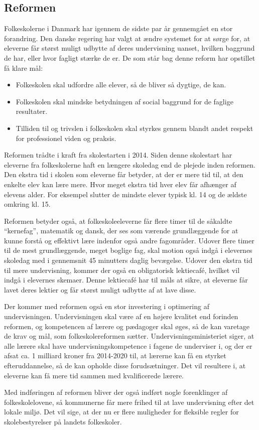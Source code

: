 \subsection{Reformen}
\label{Reformen}
Folkeskolerne i Danmark har igennem de sidste par år gennemgået en stor forandring. Den danske regering har valgt at ændre systemet for at sørge for, at eleverne får størst muligt udbytte af deres undervisning uanset, hvilken baggrund de har, eller hvor fagligt stærke de er.
De som står bag denne reform har opstillet få klare mål\cite{reformenMaal}:
	\begin{itemize}
		\item Folkeskolen skal udfordre alle elever, så de bliver så dygtige, de kan.
		\item Folkeskolen skal mindske betydningen af social baggrund for de faglige resultater.
		\item Tilliden til og trivslen i folkeskolen skal styrkes gennem blandt andet respekt for professionel viden og praksis.
	\end{itemize}

Reformen trådte i kraft fra skolestarten i 2014. Siden denne skolestart har eleverne fra folkeskolerne haft en længere skoledag end de plejede inden reformen. Den ekstra tid i skolen som eleverne får betyder, at der er mere tid til, at den enkelte elev kan lære mere. Hvor meget ekstra tid hver elev får afhænger af elevens alder. For eksempel slutter de mindste elever typisk kl. 14 og de ældste omkring kl. 15.

Reformen betyder også, at folkeskoleeleverne får flere timer til de såkaldte ``kernefag'', matematik og dansk, der ses som værende grundlæggende for at kunne forstå og effektivt lære indenfor også andre fagområder. Udover flere timer til de mest grundlæggende, meget boglige fag, skal motion også indgå i elevernes skoledag med i gennemsnit 45 minutters daglig bevægelse\cite{reformenBorger}. Udover den ekstra tid til mere undervisning, kommer der også en obligatorisk lektiecafé, hvilket vil indgå i elevernes skemaer. Denne lektiecafé har til måls at sikre, at eleverne får lavet deres lektier og får størst muligt udbytte af at lave disse.

Der kommer med reformen også en stor investering i optimering af undervisningen. Undervisningen skal være af en højere kvalitet end forinden reformen, og kompetencen af lærere og pædagoger skal øges, så de kan varetage de krav og mål, som folkeskolereformen sætter. Undervisningsministeriet siger, at alle lærere skal have undervisningskompetence i fagene de underviser i, og der er afsat ca. 1 milliard kroner fra 2014-2020 til, at lærerne kan få en styrket efteruddannelse, så de kan opholde disse forudsætninger\cite{reformenMaal}. Det vil resultere i, at eleverne kan få mere tid sammen med kvalificerede lærere.

Med indføringen af reformen bliver der også indført nogle forenklinger af folkeskolelovene, så kommunerne får mere frihed til at lave undervisning efter det lokale miljø. Det vil sige, at der nu er flere muligheder for fleksible regler for skolebestyrelser på landets folkeskoler.
